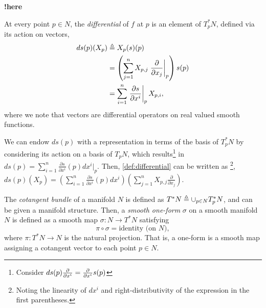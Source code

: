 {\color{magenta}\textbf{!here}\\}
{\color{red}

 

 At every point $p \in N$, the \textit{differential} of $f$ at $p$ is an element of $T^*_pN$, defined via its action on vectors, 
\begin{align}
    ds(p)(X_p) & \isdefined X_p(s)(p) \label{def:differential} \\%
     & = \left(\sum_{j = 1}^nX_{p, j}\left.\frac{\partial}{\partial x_j}\right\rvert_p\right)s(p) \notag \\
     & = \sum_{i = 1}^n \left.\frac{\partial s}{\partial x^i} \right\rvert_p X_{p, i}, \notag
\end{align}
where we note that vectors are differential operators on real valued smooth functions. 

We can endow $ds(p)$ with a representation in terms of the basis of $T^*_pN$ by considering its action on a basis of $T_pN$, which results\footnote{{\color{red}Consider $ds(p)\frac{\partial  }{\partial x^i} = \frac{\partial }{\partial x^i}s(p)$ }} in $ds(p) =\sum_{i = 1}^n \frac{\partial s}{\partial x^i}(p)dx^i\vert_p$. Then, \eqref{def:differential} can be written as \footnote{Noting the linearity of $dx^i$ and right-distributivity of the expression in the first parentheses.}, $ds(p)(X_p) = \left(\sum_{i = 1}^n \frac{\partial s}{\partial x^i}(p)dx^i  \right)\left(\sum_{j = 1}^nX_{p, j}\frac{\partial}{\partial x_j}\right)$. 

The \textit{cotangent bundle} of a manifold $N$ is defined as $T^*N \triangleq \cup_{p\in N}T_p^*N$, and can be given a manifold structure. Then, a \textit{smooth one-form} $\sigma$ on a smooth manifold $N$ is defined as a smooth map $\sigma : N \rightarrow T^*N$ satisfying $$\pi \circ \sigma = \text{identity (on } N),$$ where $\pi: T^*N \rightarrow N$ is the natural projection. That is, a one-form is a smooth map assigning a cotangent vector to each point $p\in N$.

}
